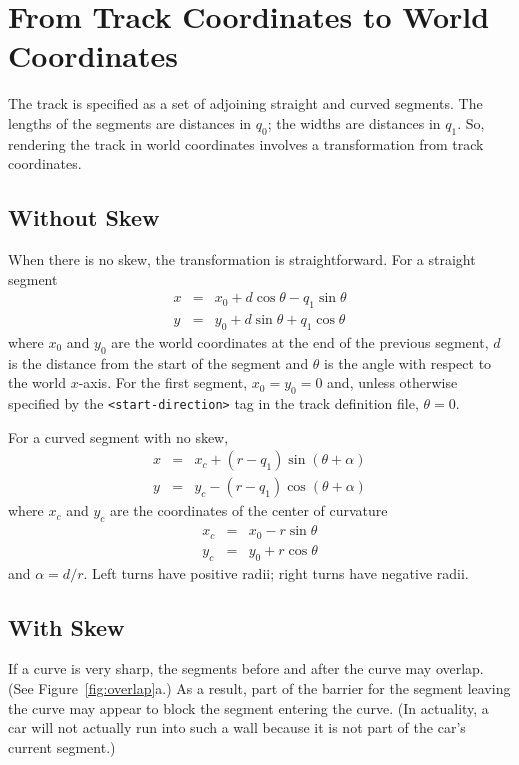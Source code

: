 \documentclass{article}
\begin{document}
\section{From Track Coordinates to World Coordinates}

The track is specified as a set of adjoining straight and curved
segments.  The lengths of the segments are distances in $q_0$; the
widths are distances in $q_1$.  So, rendering the track in world
coordinates involves a transformation from track coordinates.

\subsection{Without Skew}

When there is no skew, the transformation is straightforward.  For a
straight segment
\begin{eqnarray}
  \label{eq:straight-to-world}
  x & = & x_0 + d \cos \theta - q_1 \sin \theta \\
  y & = & y_0 + d \sin \theta + q_1 \cos \theta \nonumber
\end{eqnarray}
where $x_0$ and $y_0$ are the world coordinates at the end of the
previous segment, $d$ is the distance from the start of the segment
and $\theta$ is the angle with respect to the world $x$-axis.  For the
first segment, $x_0 = y_0 = 0$ and, unless otherwise
specified by the \verb/<start-direction>/ tag in the track definition
file, $\theta = 0$.

For a curved segment with no skew,
\begin{eqnarray}
  \label{eq:curve-to-world}
  x & = & x_c + (r - q_1) \sin (\theta + \alpha) \\
  y & = & y_c - (r - q_1) \cos (\theta + \alpha) \nonumber
\end{eqnarray}
where $x_c$ and $y_c$ are the coordinates of the center of curvature
\begin{eqnarray}
  \label{eq:center}
  x_c & = & x_0 - r \sin \theta \\ 
  y_c & = & y_0 + r \cos \theta \nonumber
\end{eqnarray}
and $\alpha = d/r$.  Left turns have positive radii; right turns have
negative radii.

\subsection{With Skew}
\label{section:skew}

If a curve is very sharp, the segments before and after the curve may
overlap. (See Figure~\ref{fig:overlap}a.)  As a result, part of the
barrier for the segment leaving the curve may appear to block the
segment entering the curve.  (In actuality, a car will not actually
run into such a wall because it is not part of the car's current
segment.)
\end{document}
